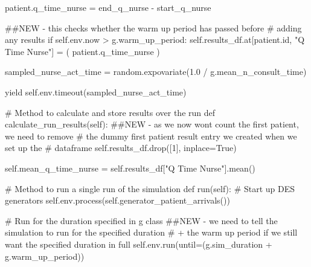\documentclass[
  letterpaper,
  DIV=11,
  numbers=noendperiod]{scrreprt}
\newenvironment{Shaded}{}{}
\newcommand{\BuiltInTok}[1]{\textcolor[rgb]{0.84,0.23,0.29}{#1}}
\newcommand{\CommentTok}[1]{\textcolor[rgb]{0.42,0.45,0.49}{#1}}
\newcommand{\ControlFlowTok}[1]{\textcolor[rgb]{0.84,0.23,0.29}{#1}}
\newcommand{\DecValTok}[1]{\textcolor[rgb]{0.00,0.36,0.77}{#1}}
\newcommand{\FloatTok}[1]{\textcolor[rgb]{0.00,0.36,0.77}{#1}}
\newcommand{\KeywordTok}[1]{\textcolor[rgb]{0.84,0.23,0.29}{#1}}
\newcommand{\NormalTok}[1]{\textcolor[rgb]{0.14,0.16,0.18}{#1}}
\newcommand{\OperatorTok}[1]{\textcolor[rgb]{0.14,0.16,0.18}{#1}}
\newcommand{\StringTok}[1]{\textcolor[rgb]{0.01,0.18,0.38}{#1}}
\newcommand{\VariableTok}[1]{\textcolor[rgb]{0.89,0.38,0.04}{#1}}
\begin{document}
\begin{Shaded}
\begin{Highlighting}[]
\NormalTok{            patient.q\_time\_nurse }\OperatorTok{=}\NormalTok{ end\_q\_nurse }\OperatorTok{{-}}\NormalTok{ start\_q\_nurse}

            \CommentTok{\#\#NEW {-} this checks whether the warm up period has passed before}
            \CommentTok{\# adding any results}
            \ControlFlowTok{if} \VariableTok{self}\NormalTok{.env.now }\OperatorTok{\textgreater{}}\NormalTok{ g.warm\_up\_period:}
                \VariableTok{self}\NormalTok{.results\_df.at[patient.}\BuiltInTok{id}\NormalTok{, }\StringTok{"Q Time Nurse"}\NormalTok{] }\OperatorTok{=}\NormalTok{ (}
\NormalTok{                    patient.q\_time\_nurse}
\NormalTok{                )}

\NormalTok{            sampled\_nurse\_act\_time }\OperatorTok{=}\NormalTok{ random.expovariate(}\FloatTok{1.0} \OperatorTok{/}
\NormalTok{                                                        g.mean\_n\_consult\_time)}

            \ControlFlowTok{yield} \VariableTok{self}\NormalTok{.env.timeout(sampled\_nurse\_act\_time)}

    \CommentTok{\# Method to calculate and store results over the run}
    \KeywordTok{def}\NormalTok{ calculate\_run\_results(}\VariableTok{self}\NormalTok{):}
        \CommentTok{\#\#NEW {-} as we now won\textquotesingle{}t count the first patient, we need to remove}
        \CommentTok{\# the dummy first patient result entry we created when we set up the}
        \CommentTok{\# dataframe}
        \VariableTok{self}\NormalTok{.results\_df.drop([}\DecValTok{1}\NormalTok{], inplace}\OperatorTok{=}\VariableTok{True}\NormalTok{)}

        \VariableTok{self}\NormalTok{.mean\_q\_time\_nurse }\OperatorTok{=} \VariableTok{self}\NormalTok{.results\_df[}\StringTok{"Q Time Nurse"}\NormalTok{].mean()}

    \CommentTok{\# Method to run a single run of the simulation}
    \KeywordTok{def}\NormalTok{ run(}\VariableTok{self}\NormalTok{):}
        \CommentTok{\# Start up DES generators}
        \VariableTok{self}\NormalTok{.env.process(}\VariableTok{self}\NormalTok{.generator\_patient\_arrivals())}

        \CommentTok{\# Run for the duration specified in g class}
        \CommentTok{\#\#NEW {-} we need to tell the simulation to run for the specified duration}
        \CommentTok{\# + the warm up period if we still want the specified duration in full}
        \VariableTok{self}\NormalTok{.env.run(until}\OperatorTok{=}\NormalTok{(g.sim\_duration }\OperatorTok{+}\NormalTok{ g.warm\_up\_period))}


\end{Highlighting}
\end{Shaded}
\end{document}
